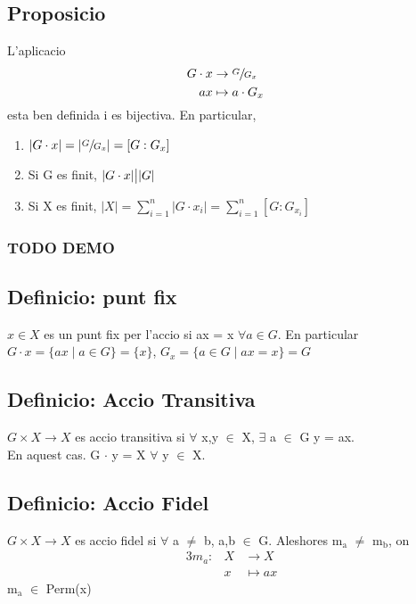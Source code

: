 \documentclass[11pt]{article}
\begin{document}
\subsection{Proposicio}
\label{sec:orgd7f6323}
L'aplicacio
\begin{alignat*}{3}
G \cdot x &\to \sfrac{G}{G_x}& \\
ax &\mapsto a\cdot G_x&
\end{alignat*}
esta ben definida i es bijectiva. En particular, \\
\begin{enumerate}
\item \(\lvert G \cdot x \rvert = \lvert \sfrac{G}{G_x} \rvert = [G:G_x]\)
\item Si G es finit, \(\lvert G \cdot x \rvert \big{|} \lvert G \rvert\)
\item Si X es finit, \(\lvert X \rvert = \sum_{i=1}^{n} \lvert G \cdot x_i \rvert = \sum_{i=1}^n [G:G_{x_i}]\)
\end{enumerate}
\subsubsection{{\bfseries\sffamily TODO} DEMO}
\label{sec:orgbebfc58}

\subsection{Definicio: punt fix}
\label{sec:org622c517}
\(x \in X\) es un punt fix per l'accio si ax = x \(\forall a \in G\). En particular\\
\(G \cdot x = \{ax \mid a \in G\} = \{x\}\), \(G_x = \{ a \in G \mid ax = x \} = G\)

\subsection{Definicio: Accio Transitiva}
\label{sec:orgcfb0270}
\(G \times X \to X\) es accio transitiva si \(\forall\) x,y \(\in\) X, \(\exists\) a \(\in\) G  y = ax. \\
En aquest cas. G \(\cdot\) y = X \(\forall\) \quad y \(\in\) X.

\subsection{Definicio: Accio Fidel}
\label{sec:orgbcfc064}
\(G \times X \to X\) es accio fidel si \(\forall\) a \(\neq\) b, a,b \(\in\) G. Aleshores m\(_{\text{a}}\) \(\neq\) m\(_{\text{b}}\), on
\begin{alignat*}{3}
m_a: &X &\to X \\
&x &\mapsto ax
\end{alignat*}
m\(_{\text{a}}\) \(\in\) Perm(x)
\end{document}
